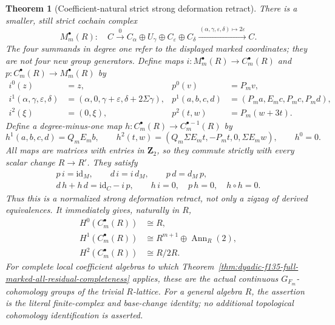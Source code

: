 \documentclass[11pt]{article}
\newtheorem{theorem}{Theorem}[section]
\theoremstyle{definition}
\begin{document}
\begin{theorem}[Coefficient-natural strict strong deformation retract]
\label{thm:dyadic-f137-universal-strong-retract}
There is a smaller, still \emph{strict} cochain complex
\begin{equation}\label{eq:dyadic-f137-minimal-coefficient-complex}
\boxed{
M^\bullet_m(R):
\quad C\xrightarrow{\ 0\ }
 C_{\alpha}\oplus U_{\gamma}\oplus
 C_{\varepsilon}\oplus C_{\delta}
 \xrightarrow{\,(\alpha,\gamma,\varepsilon,\delta)
                   \mapsto 2\varepsilon\,}C .
}
\end{equation}
The four summands in degree one refer to the
displayed marked coordinates; they are not
four new group generators.  Define maps
$i:M^\bullet_m(R)\to C^\bullet_m(R)$ and
$p:C^\bullet_m(R)\to M^\bullet_m(R)$ by
\begin{equation}\label{eq:dyadic-f137-retract-ip}
\boxed{
\begin{aligned}
i^0(z)&=z,&
p^0(v)&=P_mv,\\
i^1(\alpha,\gamma,\varepsilon,\delta)
  &=(\alpha,0,\gamma+\varepsilon,
       \delta+2\Sigma\gamma),&
p^1(a,b,c,d)&=(P_ma,E_mc,P_mc,P_md),\\
i^2(\xi)&=(0,\xi),&
p^2(t,w)&=P_m(w+3t).
\end{aligned}}
\end{equation}
Define a degree-minus-one map
$h:C^\bullet_m(R)\to C^{\bullet-1}_m(R)$ by
\begin{equation}\label{eq:dyadic-f137-retract-h}
\boxed{
h^1(a,b,c,d)=Q_mE_mb,\qquad
h^2(t,w)=
 (Q_m\Sigma E_mt,-P_mt,0,\Sigma E_mw),
\qquad h^0=0.
}
\end{equation}
All maps are matrices with entries in $\mathbf Z_2$,
so they commute \emph{strictly} with every scalar
change $R\to R'$.
They satisfy
\begin{equation}\label{eq:dyadic-f137-retract-sdr-identities}
\boxed{
\begin{gathered}
p\,i=\mathrm{id}_{M},\qquad
d\,i=i\,d_M,\qquad p\,d=d_M\,p,\\
d\,h+h\,d=\mathrm{id}_{C}-i\,p,\qquad
h\,i=0,\quad p\,h=0,\quad h\circ h=0 .
\end{gathered}}
\end{equation}
Thus this is a normalized \emph{strong deformation
retract}, not only a zigzag of derived equivalences.
It immediately gives, naturally in $R$,
\begin{equation}\label{eq:dyadic-f137-arbitrary-coeff-cohomology}
\boxed{
\begin{aligned}
H^0(C^\bullet_m(R))&\cong R,\\
H^1(C^\bullet_m(R))&\cong
 R^{m+1}\oplus\operatorname{Ann}_{R}(2),\\
H^2(C^\bullet_m(R))&\cong R/2R.
\end{aligned}}
\end{equation}
For complete local coefficient algebras to which
Theorem~\ref{thm:dyadic-f135-full-marked-all-residual-completeness}
applies, these are the actual continuous
$G_{F_m}$-cohomology groups of the trivial $R$-lattice.
For a general algebra $R$, the assertion is the
literal finite-complex and base-change identity;
no additional topological cohomology identification
is asserted.
\end{theorem}
\end{document}

